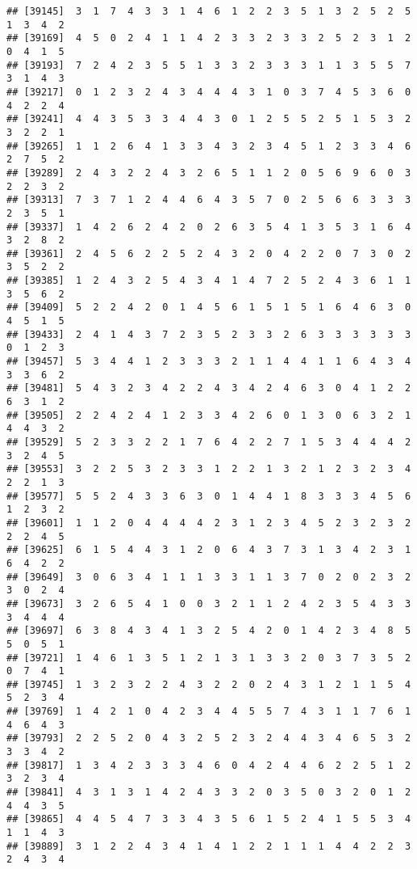 \documentclass[
]{article}
\begin{document}
\begin{verbatim}
## [39145]  3  1  7  4  3  3  1  4  6  1  2  2  3  5  1  3  2  5  2  5  1  3  4  2
## [39169]  4  5  0  2  4  1  1  4  2  3  3  2  3  3  2  5  2  3  1  2  0  4  1  5
## [39193]  7  2  4  2  3  5  5  1  3  3  2  3  3  3  1  1  3  5  5  7  3  1  4  3
## [39217]  0  1  2  3  2  4  3  4  4  4  3  1  0  3  7  4  5  3  6  0  4  2  2  4
## [39241]  4  4  3  5  3  3  4  4  3  0  1  2  5  5  2  5  1  5  3  2  3  2  2  1
## [39265]  1  1  2  6  4  1  3  3  4  3  2  3  4  5  1  2  3  3  4  6  2  7  5  2
## [39289]  2  4  3  2  2  4  3  2  6  5  1  1  2  0  5  6  9  6  0  3  2  2  3  2
## [39313]  7  3  7  1  2  4  4  6  4  3  5  7  0  2  5  6  6  3  3  3  2  3  5  1
## [39337]  1  4  2  6  2  4  2  0  2  6  3  5  4  1  3  5  3  1  6  4  3  2  8  2
## [39361]  2  4  5  6  2  2  5  2  4  3  2  0  4  2  2  0  7  3  0  2  3  5  2  2
## [39385]  1  2  4  3  2  5  4  3  4  1  4  7  2  5  2  4  3  6  1  1  3  5  6  2
## [39409]  5  2  2  4  2  0  1  4  5  6  1  5  1  5  1  6  4  6  3  0  4  5  1  5
## [39433]  2  4  1  4  3  7  2  3  5  2  3  3  2  6  3  3  3  3  3  3  0  1  2  3
## [39457]  5  3  4  4  1  2  3  3  3  2  1  1  4  4  1  1  6  4  3  4  3  3  6  2
## [39481]  5  4  3  2  3  4  2  2  4  3  4  2  4  6  3  0  4  1  2  2  6  3  1  2
## [39505]  2  2  4  2  4  1  2  3  3  4  2  6  0  1  3  0  6  3  2  1  4  4  3  2
## [39529]  5  2  3  3  2  2  1  7  6  4  2  2  7  1  5  3  4  4  4  2  3  2  4  5
## [39553]  3  2  2  5  3  2  3  3  1  2  2  1  3  2  1  2  3  2  3  4  2  2  1  3
## [39577]  5  5  2  4  3  3  6  3  0  1  4  4  1  8  3  3  3  4  5  6  1  2  3  2
## [39601]  1  1  2  0  4  4  4  4  2  3  1  2  3  4  5  2  3  2  3  2  2  2  4  5
## [39625]  6  1  5  4  4  3  1  2  0  6  4  3  7  3  1  3  4  2  3  1  6  4  2  2
## [39649]  3  0  6  3  4  1  1  1  3  3  1  1  3  7  0  2  0  2  3  2  3  0  2  4
## [39673]  3  2  6  5  4  1  0  0  3  2  1  1  2  4  2  3  5  4  3  3  3  4  4  4
## [39697]  6  3  8  4  3  4  1  3  2  5  4  2  0  1  4  2  3  4  8  5  5  0  5  1
## [39721]  1  4  6  1  3  5  1  2  1  3  1  3  3  2  0  3  7  3  5  2  0  7  4  1
## [39745]  1  3  2  3  2  2  4  3  2  2  0  2  4  3  1  2  1  1  5  4  5  2  3  4
## [39769]  1  4  2  1  0  4  2  3  4  4  5  5  7  4  3  1  1  7  6  1  4  6  4  3
## [39793]  2  2  5  2  0  4  3  2  5  2  3  2  4  4  3  4  6  5  3  2  3  3  4  2
## [39817]  1  3  4  2  3  3  3  4  6  0  4  2  4  4  6  2  2  5  1  2  3  2  3  4
## [39841]  4  3  1  3  1  4  2  4  3  3  2  0  3  5  0  3  2  0  1  2  4  4  3  5
## [39865]  4  4  5  4  7  3  3  4  3  5  6  1  5  2  4  1  5  5  3  4  1  1  4  3
## [39889]  3  1  2  2  4  3  4  1  4  1  2  2  1  1  1  4  4  2  2  3  2  4  3  4

\end{verbatim}
\end{document}
